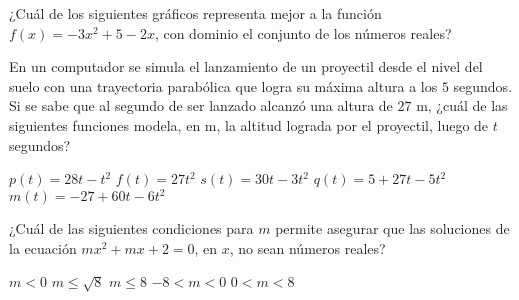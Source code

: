 \documentclass[
  titulo=Prueba,
  subtitulo=Álgebra y funciones,
  curso=Tercero medio B,
  fecha=2025-09-26,
  con nombre,
  ppp=1
]{srs3}
\begin{document}
\begin{preguntas}
\pregunta ¿Cuál de los siguientes gráficos representa mejor a la función \(f\left(x\right) = -3x^2 + 5 - 2x\), con dominio el conjunto de los números reales?
\begin{alternativas}[2]
\alternativa {}
\alternativa {}
\alternativa {}
\alternativa {}
\end{alternativas}

\pregunta En un computador se simula el lanzamiento de un proyectil desde el nivel del suelo con una trayectoria parabólica que logra su máxima altura a los \(5\) segundos. Si se sabe que al segundo de ser lanzado alcanzó una altura de \(27\) m, ¿cuál de las siguientes funciones modela, en m, la altitud lograda por el proyectil, luego de \(t\) segundos?
\begin{alternativas}
\alternativa \( p\left(t\right)=28t-t^2 \)
\alternativa \( f\left(t\right)=27t^2 \)
\alternativa \( s\left(t\right)=30t-3t^2 \)
\alternativa \( q\left(t\right)=5+27t-5t^2 \)
\alternativa \( m\left(t\right)=-27+60t-6t^2 \)
\end{alternativas}

\pregunta ¿Cuál de las siguientes condiciones para \(m\) permite asegurar que las soluciones de la ecuación \( mx^2+mx+2=0 \), en \(x\), no sean números reales?
\begin{alternativas}
\alternativa \( m < 0 \)
\alternativa \( m \leq \sqrt{8} \)
\alternativa \( m \leq 8 \)
\alternativa \( -8 < m < 0 \)
\alternativa \( 0 < m < 8 \)
\end{alternativas}


\end{preguntas}
\end{document}
